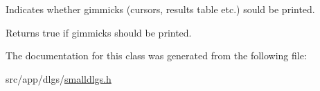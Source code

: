 Indicates whether gimmicks (cursors, results table etc.) sould be printed. 

\begin{DoxyReturn}{Returns}
true if gimmicks should be printed. 
\end{DoxyReturn}


The documentation for this class was generated from the following file:\begin{DoxyCompactItemize}
\item 
src/app/dlgs/\hyperlink{smalldlgs_8h}{smalldlgs.h}\end{DoxyCompactItemize}

